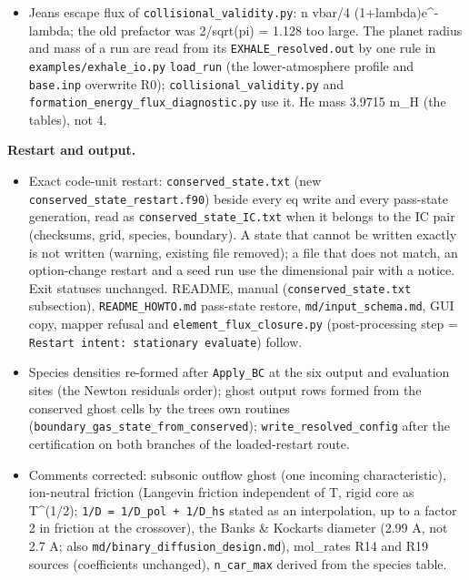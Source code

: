 \documentclass[english,a4paper]{my_memo}
\providecommand{\tightlist}{\setlength{\itemsep}{0pt}\setlength{\parskip}{0pt}}
\begin{document}
\begin{itemize}
  admissibility test and at write-back. The decay-rate diagnostic releases
  the He II / He III fixed flags as well.
\item
  Jeans escape flux of \texttt{collisional\_validity.py}: n vbar/4 (1+lambda)e\^{}-lambda;
  the old prefactor was 2/sqrt(pi) = 1.128 too large. The planet radius and
  mass of a run are read from its \texttt{EXHALE\_resolved.out} by one rule in
  \texttt{examples/exhale\_io.py} \texttt{load\_run} (the lower-atmosphere profile and
  \texttt{base.inp} overwrite R0); \texttt{collisional\_validity.py} and
  \texttt{formation\_energy\_flux\_diagnostic.py} use it. He mass 3.9715 m\_H (the
  table\textquotesingle s), not 4.
\end{itemize}

\textbf{Restart and output.}

\begin{itemize}
\tightlist
\item
  Exact code-unit restart: \texttt{conserved\_state.txt} (new
  \texttt{conserved\_state\_restart.f90}) beside every \textquotesingle eq\textquotesingle{} write and every pass-state
  generation, read as \texttt{conserved\_state\_IC.txt} when it belongs to the IC pair
  (checksums, grid, species, boundary). A state that cannot be written
  exactly is not written (warning, existing file removed); a file that does
  not match, an option-change restart and a seed run use the dimensional pair
  with a notice. Exit statuses unchanged. README, manual (\texttt{conserved\_state.txt}
  subsection), \texttt{README\_HOWTO.md} pass-state restore, \texttt{md/input\_schema.md},
  GUI copy, mapper refusal and \texttt{element\_flux\_closure.py} (post-processing
  step = \texttt{Restart\ intent:\ stationary\ evaluate}) follow.
\item
  Species densities re-formed after \texttt{Apply\_BC} at the six output and
  evaluation sites (the Newton residual\textquotesingle s order); ghost output rows formed
  from the conserved ghost cells by the tree\textquotesingle s own routines
  (\texttt{boundary\_gas\_state\_from\_conserved}); \texttt{write\_resolved\_config} after the
  certification on both branches of the loaded-restart route.
\item
  Comments corrected: subsonic outflow ghost (one incoming characteristic),
  ion-neutral friction (Langevin friction independent of T, rigid core
  as T\^{}(1/2); \texttt{1/D\ =\ 1/D\_pol\ +\ 1/D\_hs} stated as an interpolation, up to a
  factor 2 in friction at the crossover), the Banks \& Kockarts diameter
  (2.99 A, not 2.7 A; also \texttt{md/binary\_diffusion\_design.md}), mol\_rates R14
  and R19 sources (coefficients unchanged), \texttt{n\_car\_max} derived from the
  species table.
\end{itemize}
\end{document}
